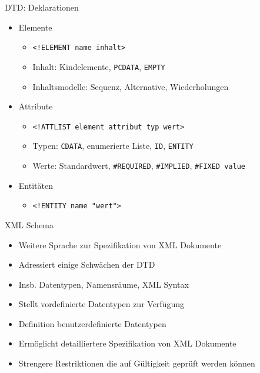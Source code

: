 \documentclass{beamer}
\begin{document}
\begin{frame}{DTD: Deklarationen}
	
	\begin{itemize}
		\item Elemente
		\begin{itemize}
			\item \texttt{<!ELEMENT name inhalt>}
			\item Inhalt: Kindelemente, \texttt{PCDATA}, \texttt{EMPTY}
			\item Inhaltsmodelle: Sequenz, Alternative, Wiederholungen
		\end{itemize}
		\item Attribute
		\begin{itemize}
			\item \texttt{<!ATTLIST element attribut typ wert>}
			\item Typen: \texttt{CDATA}, enumerierte Liste, \texttt{ID}, \texttt{ENTITY}
			\item Werte: Standardwert, \texttt{\#REQUIRED}, \texttt{\#IMPLIED}, \texttt{\#FIXED value}
		\end{itemize}
		\item Entitäten
		\begin{itemize}
			\item \texttt{<!ENTITY name "wert">}
		\end{itemize}
	\end{itemize}
	
\end{frame}

\begin{frame}{XML Schema}
	
	\begin{itemize}
		\item Weitere Sprache zur Spezifikation von XML Dokumente
		\item Adressiert einige Schwächen der DTD
		\item Insb. Datentypen, Namensräume, XML Syntax
		\item Stellt vordefinierte Datentypen zur Verfügung
		\item Definition benutzerdefinierte Datentypen
		\item Ermöglicht detailliertere Spezifikation von XML Dokumente
		\item Strengere Restriktionen die auf Gültigkeit geprüft werden können
	\end{itemize}
	
\end{frame}
\end{document}
